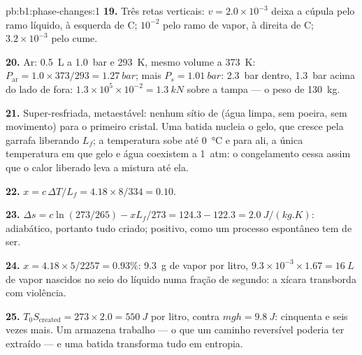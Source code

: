 \begin{solution}{pb:b1:phase-changes:1}
\textbf{19.} Três retas verticais: $v = 2.0 \times 10^{-3}$ deixa a cúpula
pelo ramo líquido, à esquerda de C; $10^{-2}$ pelo ramo de vapor,
à direita de C; $3.2 \times 10^{-3}$ pelo cume.

\textbf{20.} Ar: \qty{0.5}{L} a \qty{1.0}{bar} e \qty{293}{K}, mesmo volume a
\qty{373}{K}: $P_{\text{ar}} = 1.0 \times 373/293 = \qty{1.27}{bar}$; mais
$P_s = \qty{1.01}{bar}$: \qty{2.3}{bar} dentro, \qty{1.3}{bar} acima do
lado de fora: $1.3 \times 10^5 \times 10^{-2} = \qty{1.3}{kN}$ sobre a tampa --- o
peso de \qty{130}{kg}.

\textbf{21.} Super-resfriada, metaestável: nenhum sítio de  (água limpa,
sem poeira, sem movimento) para o primeiro cristal. Uma batida nucleia o gelo, que
cresce pela garrafa liberando $L_f$; a temperatura sobe até
\qty{0}{\degreeCelsius} e para ali, a única temperatura em que gelo
e água coexistem a \qty{1}{atm}: o congelamento cessa assim que o
calor liberado leva a mistura até ela.

\textbf{22.} $x = c\,\Delta T/L_f = 4.18 \times 8/334 = 0.10$.

\textbf{23.} $\Delta s = c\ln(273/265) - xL_f/273 = 124.3 - 122.3 =
\qty{+2.0}{J/(kg.K)}$: adiabático, portanto tudo criado; positivo, como um
processo espontâneo tem de ser.

\textbf{24.} $x = 4.18 \times 5/2257 = 0.93\%$: \qty{9.3}{g} de vapor por litro,
$9.3 \times 10^{-3} \times 1.67 = \qty{16}{L}$ de vapor nascidos no seio do líquido numa
fração de segundo: a xícara transborda com violência.

\textbf{25.} $T_0S_{\mathrm{created}} = 273 \times 2.0 = \qty{550}{J}$ por litro,
contra $mgh = \qty{9.8}{J}$: cinquenta e seis vezes mais. Um 
armazena trabalho --- o que um caminho reversível poderia ter extraído --- e uma
batida transforma tudo em entropia.
\end{solution}
